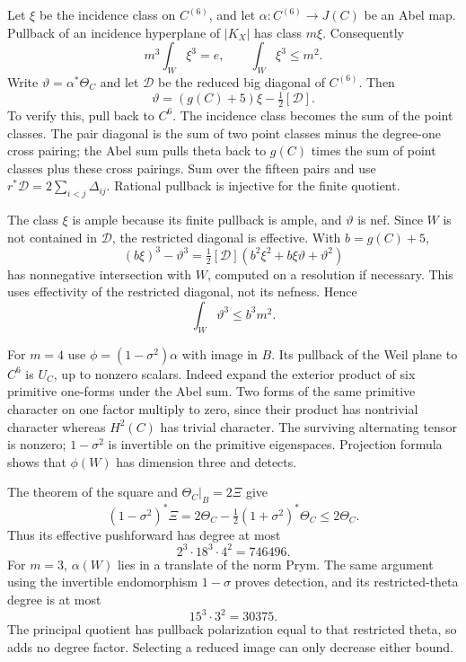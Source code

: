 \documentclass[11pt]{article}
\theoremstyle{definition}
\theoremstyle{remark}
\begin{document}
Let $\xi$ be the incidence class on $C^{(6)}$, and let $\alpha:C^{(6)}\to J(C)$ be an Abel map. Pullback of an incidence hyperplane of $|K_X|$ has class $m\xi$. Consequently
\begin{equation}\label{eq:cyclic-incidence}
 m^3\int_W\xi^3=e,\qquad \int_W\xi^3\le m^2.
\end{equation}
Write $\vartheta=\alpha^*\Theta_C$ and let $\mathcal D$ be the reduced big diagonal of $C^{(6)}$. Then
\begin{equation}\label{eq:symmetric-theta}
 \vartheta=(g(C)+5)\xi-\tfrac12[\mathcal D].
\end{equation}
To verify this, pull back to $C^6$. The incidence class becomes the sum of the point classes. The pair diagonal is the sum of two point classes minus the degree-one cross pairing; the Abel sum pulls theta back to $g(C)$ times the sum of point classes plus these cross pairings. Sum over the fifteen pairs and use $r^*\mathcal D=2\sum_{i<j}\Delta_{ij}$. Rational pullback is injective for the finite quotient.

The class $\xi$ is ample because its finite pullback is ample, and $\vartheta$ is nef. Since $W$ is not contained in $\mathcal D$, the restricted diagonal is effective. With $b=g(C)+5$,
\[
 (b\xi)^3-\vartheta^3
 =\tfrac12[\mathcal D](b^2\xi^2+b\xi\vartheta+\vartheta^2)
\]
has nonnegative intersection with $W$, computed on a resolution if necessary. This uses effectivity of the restricted diagonal, not its nefness. Hence
\begin{equation}\label{eq:cyclic-theta-degree}
 \int_W\vartheta^3\le b^3m^2.
\end{equation}

For $m=4$ use $\phi=(1-\sigma^2)\alpha$ with image in $B$. Its pullback of the Weil plane to $C^6$ is $U_C$, up to nonzero scalars. Indeed expand the exterior product of six primitive one-forms under the Abel sum. Two forms of the same primitive character on one factor multiply to zero, since their product has nontrivial character whereas $H^2(C)$ has trivial character. The surviving alternating tensor is nonzero; $1-\sigma^2$ is invertible on the primitive eigenspaces. Projection formula shows that $\phi(W)$ has dimension three and detects.

The theorem of the square and $\Theta_C|_B=2\Xi$ give
\[
 (1-\sigma^2)^*\Xi
 =2\Theta_C-\tfrac12(1+\sigma^2)^*\Theta_C
 \le2\Theta_C.
\]
Thus its effective pushforward has degree at most
\[
 2^3\cdot18^3\cdot4^2=746496.
\]
For $m=3$, $\alpha(W)$ lies in a translate of the norm Prym. The same argument using the invertible endomorphism $1-\sigma$ proves detection, and its restricted-theta degree is at most
\[
 15^3\cdot3^2=30375.
\]
The principal quotient has pullback polarization equal to that restricted theta, so adds no degree factor. Selecting a reduced image can only decrease either bound.
\end{document}
